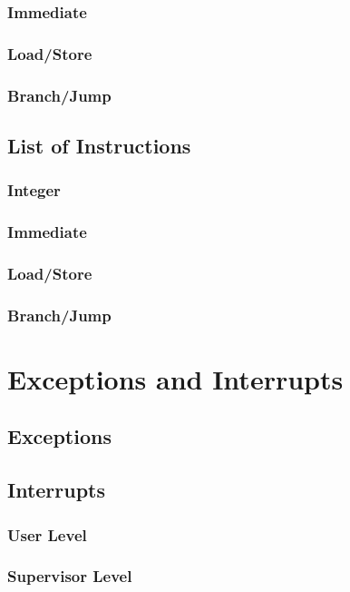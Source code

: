 \documentclass[letterpaper, 11pt]{article}
\begin{document}
\subsubsection{Immediate}
\subsubsection{Load/Store}
\subsubsection{Branch/Jump}

\subsection{List of Instructions}
\subsubsection{Integer}
\subsubsection{Immediate}
\subsubsection{Load/Store}
\subsubsection{Branch/Jump}




\section{Exceptions and Interrupts}
\subsection{Exceptions}


\subsection{Interrupts}
\subsubsection{User Level}
\subsubsection{Supervisor Level}
\end{document}
